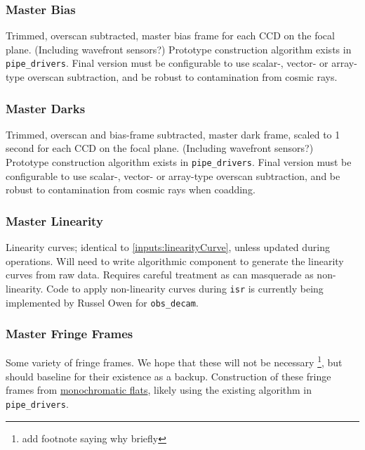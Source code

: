 \subsubsection{Master Bias}\label{calibProducts:bias}
Trimmed, overscan subtracted, master bias frame for each CCD on the focal plane. \rednote (Including wavefront sensors?)
\alg Prototype construction algorithm exists in \texttt{pipe\_drivers}. Final version must be configurable to use scalar-, vector- or array-type overscan subtraction, and be robust to contamination from cosmic rays.


\subsubsection{Master Darks}\label{calibProducts:dark}
Trimmed, overscan and bias-frame subtracted, master dark frame, scaled to 1 second for each CCD on the focal plane. \rednote (Including wavefront sensors?)
\alg Prototype construction algorithm exists in \texttt{pipe\_drivers}. Final version must be configurable to use scalar-, vector- or array-type overscan subtraction, and be robust to contamination from cosmic rays when coadding.


\subsubsection{Master Linearity}\label{calibProducts:linearityCurve}
Linearity curves; identical to \secsymbol\ref{inputs:linearityCurve}, unless updated during operations.
\alg Will need to write algorithmic component to generate the linearity curves from raw data. Requires careful treatment as \bfeffect can masquerade as non-linearity. Code to apply non-linearity curves during \texttt{isr} is currently being implemented by Russel Owen for \texttt{obs\_decam}.


\subsubsection{Master Fringe Frames}\label{calibProducts:fringeFrames}
Some variety of fringe frames. We hope that these will not be necessary \footnote{\xxx add footnote saying why briefly}, but should baseline for their existence as a backup.
\alg Construction of these fringe frames from \hyperref[inputs:monoFlat]{monochromatic flats}, likely using the existing algorithm in \texttt{pipe\_drivers}.


